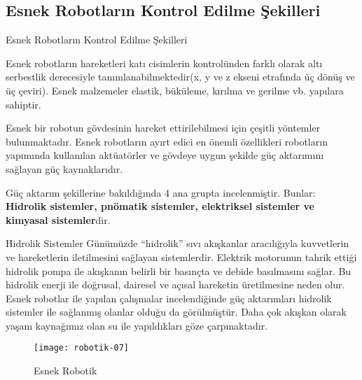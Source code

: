\documentclass{beamer}
\begin{document}
\subsection{Esnek Robotların Kontrol Edilme Şekilleri}

\begin{frame}{Esnek Robotların Kontrol Edilme Şekilleri}
\begin{block}
\item Esnek robotların hareketleri katı cisimlerin kontrolünden farklı olarak altı serbestlik derecesiyle tanımlanabilmektedir(x, y ve z ekseni etrafında üç dönüş ve üç çeviri). Esnek malzemeler elastik, büküleme, kırılma ve gerilme vb. yapılara sahiptir.

\item Esnek bir robotun gövdesinin hareket ettirilebilmesi için çeşitli yöntemler bulunmaktadır. Esnek robotların ayırt edici en önemli özellikleri robotların yapımında kullanılan aktüatörler ve gövdeye uygun şekilde güç aktarımını sağlayan güç kaynaklarıdır.
\end{block}
\end{frame}

\begin{frame}
\begin{block}
\item Güç aktarım şekillerine bakıldığında 4 ana grupta incelenmiştir. Bunlar: \textbf{Hidrolik sistemler, pnömatik sistemler, elektriksel sistemler ve kimyasal sistemler}dir.
\end{block}
\end{frame}

\begin{frame}
\begin{block}{Hidrolik Sistemler}
Günümüzde “hidrolik” sıvı akışkanlar aracılığıyla kuvvetlerin ve hareketlerin iletilmesini sağlayan sistemlerdir. Elektrik motorunun tahrik ettiği hidrolik pompa ile akışkanın belirli bir basınçta ve debide basılmasını sağlar. Bu hidrolik enerji ile doğrusal, dairesel ve açısal hareketin üretilmesine neden olur. Esnek robotlar ile yapılan çalışmalar incelendiğinde güç aktarımları hidrolik sistemler ile sağlanmış olanlar olduğu da görülmüştür. Daha çok akışkan olarak yaşam kaynağımız olan su ile yapıldıkları göze çarpmaktadır.
\end{block}
\begin{figure}
\texttt{[image: robotik-07]}
\caption{\label{Şekil-7} Esnek Robotik}
\end{figure}
\end{frame}
\end{document}
